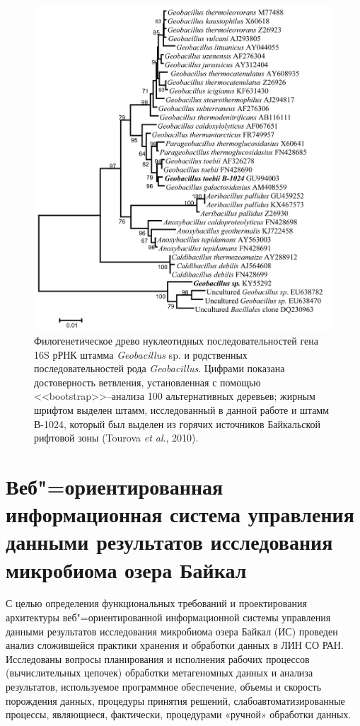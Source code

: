 \documentclass[a4paper,12pt,openany,final]{extreport}
\def\oldcaption{} \let\oldcaption=\caption
\def\caption{\stepcounter{captionsnum}\oldcaption}
\begin{document}
\begin{figure}[h!]\centering
\includegraphics[width=0.9\linewidth]{media/image13.png}

\caption{Филогенетическое древо нуклеотидных последовательностей гена 16S рРНК штамма \emph{Geobacillus} sp. и родственных последовательностей рода \emph{Geobacillus}. Цифрами показана достоверность ветвления, установленная с помощью <<bootstrap>>--анализа 100 альтернативных деревьев; жирным шрифтом выделен штамм, исследованный в данной работе и штамм В-1024, который был выделен из горячих источников Байкальской рифтовой зоны (Tourova \textit{et al}., 2010).}\label{fig:5-2}
\end{figure}


\chapter{Веб"=ориентированная информационная система управления данными результатов исследования микробиома озера Байкал}\label{chap:6}

С целью определения функциональных требований и проектирования архитектуры веб"=ориентированной информационной системы управления данными результатов исследования микробиома озера Байкал (ИС) проведен анализ сложившейся практики хранения и обработки данных в ЛИН СО РАН. Исследованы вопросы планирования и исполнения рабочих процессов (вычислительных цепочек) обработки метагеномных данных и анализа результатов, используемое программное обеспечение, объемы и скорость порождения данных, процедуры принятия решений, слабоавтоматизированные процессы, являющиеся, фактически, процедурами «ручной» обработки данных.
\end{document}
